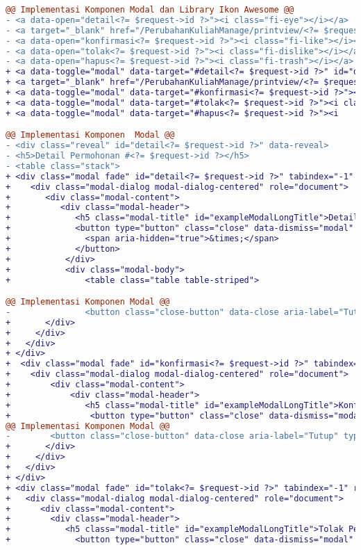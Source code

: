 \begin{lstlisting}[language=diff, label=Entri, basicstyle=\ttfamily, frame=single,
columns=fullflexible, keepspaces=true, breaklines=true]
@@ Implementasi Komponen Modal dan Library Ikon Awesome @@
- <a data-open="detail<?= $request->id ?>"><i class="fi-eye"></i></a>
- <a target="_blank" href="/PerubahanKuliahManage/printview/<?= $request->id ?>"><i class="fi-print"></i></a>
- <a data-open="konfirmasi<?= $request->id ?>"><i class="fi-like"></i></a>                                    
- <a data-open="tolak<?= $request->id ?>"><i class="fi-dislike"></i></a>
- <a data-open="hapus<?= $request->id ?>"><i class="fi-trash"></i></a>
+ <a data-toggle="modal" data-target="#detail<?= $request->id ?>" id="detailIkon<?= $request->id ?>"><i class="fas fa-eye blueiconcolor"></i></a>
+ <a target="_blank" href="/PerubahanKuliahManage/printview/<?= $request->id ?>"><i class="fas fa-print"></i></a>
+ <a data-toggle="modal" data-target="#konfirmasi<?= $request->id ?>"><i class="fas fa-thumbs-up"></i></a>
+ <a data-toggle="modal" data-target="#tolak<?= $request->id ?>"><i class="fas fa-thumbs-down"></i></a>
+ <a data-toggle="modal" data-target="#hapus<?= $request->id ?>"><i 

@@ Implementasi Komponen  Modal @@
- <div class="reveal" id="detail<?= $request->id ?>" data-reveal>
- <h5>Detail Permohonan #<?= $request->id ?></h5>
- <table class="stack">
+ <div class="modal fade" id="detail<?= $request->id ?>" tabindex="-1" role="dialog" aria-hidden="true">
+    <div class="modal-dialog modal-dialog-centered" role="document">
+       <div class="modal-content">
+          <div class="modal-header">
+             <h5 class="modal-title" id="exampleModalLongTitle">Detail Permohonan #<?= $request->id ?></h5>
+             <button type="button" class="close" data-dismiss="modal" aria-label="Close">
+               <span aria-hidden="true">&times;</span>
+             </button>
+           </div>
+           <div class="modal-body">
+               <table class="table table-striped">

@@ Implementasi Komponen Modal @@
-               <button class="close-button" data-close aria-label="Tutup" type="button">
+       </div>
+     </div>
+   </div>
+ </div>
+  <div class="modal fade" id="konfirmasi<?= $request->id ?>" tabindex="-1" role="dialog" aria-hidden="true">
+    <div class="modal-dialog modal-dialog-centered" role="document">
+        <div class="modal-content">
+            <div class="modal-header">
+               <h5 class="modal-title" id="exampleModalLongTitle">Konfirmasi Permohonan #<?= $request->id ?></h5>
+                <button type="button" class="close" data-dismiss="modal" aria-label="Close">
@@ Implementasi Komponen Modal @@
-        <button class="close-button" data-close aria-label="Tutup" type="button">
+       </div>
+     </div>
+   </div>
+ </div>
+ <div class="modal fade" id="tolak<?= $request->id ?>" tabindex="-1" role="dialog" aria-hidden="true">
+   <div class="modal-dialog modal-dialog-centered" role="document">
+      <div class="modal-content">
+        <div class="modal-header">
+           <h5 class="modal-title" id="exampleModalLongTitle">Tolak Permohonan #<?= $request->id ?></h5>
+             <button type="button" class="close" data-dismiss="modal" 


\end{lstlisting}
